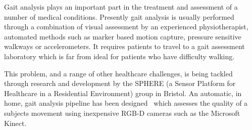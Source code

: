 \documentclass[11pt]{article} %
\begin{document}

Gait analysis plays an important part in the treatment and assessment of a number of medical conditions. Presently gait analysis is usually performed through a combination of visual assessment by an experienced physiotherapist, automated methods such as marker based motion capture, pressure sensitive walkways or accelerometers. It requires patients to travel to a gait assessment laboratory which is far from ideal for patients who have difficulty walking. 

This problem, and a range of other healthcare challenges, is being tackled through research and development by the SPHERE (a Sensor Platform for Healthcare in a Residential Environment) group in Bristol. An automatic, in home, gait analysis pipeline has been designed~\cite{Paiement,Tao} which assesses the quality of a subjects movement using inexpensive RGB-D cameras such as the Microsoft Kinect.
\end{document}

